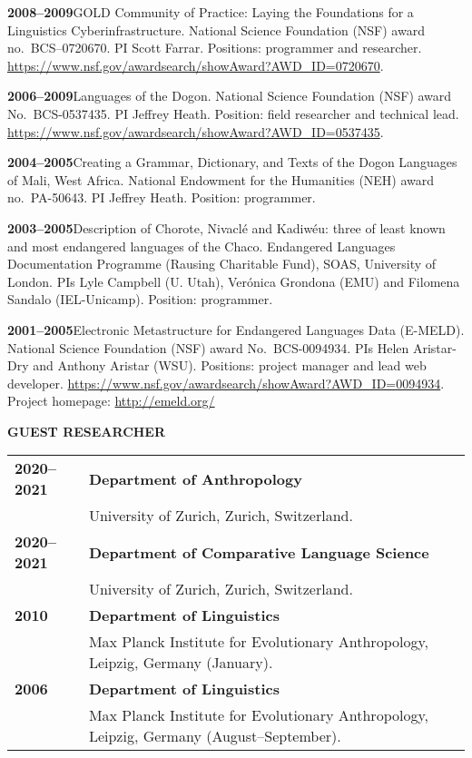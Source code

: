 \documentclass[11pt]{article}
\newcommand{\hangpara}{
 \setlength{\parindent}{0in} %
 \hangindent=0.42in %
}
\begin{document}
\vskip 6pt
\hangpara
{\bf 2008--2009}\hspace{1ex}GOLD Community of Practice: Laying the Foundations for a Linguistics Cyberinfrastructure. National Science Foundation (NSF) award no.\ BCS--0720670. PI Scott Farrar. Positions: programmer and researcher. \url{https://www.nsf.gov/awardsearch/showAward?AWD_ID=0720670}. %

\vskip 6pt
\hangpara
{\bf 2006--2009}\hspace{1ex}Languages of the Dogon. National Science Foundation (NSF) award No.\ BCS-0537435. PI Jeffrey Heath. Position: field researcher and technical lead. \url{https://www.nsf.gov/awardsearch/showAward?AWD_ID=0537435}.

\vskip 6pt
\hangpara
{\bf 2004--2005}\hspace{1ex}Creating a Grammar, Dictionary, and Texts of the Dogon Languages of Mali, West Africa. National Endowment for the Humanities (NEH) award no.\ PA-50643. PI Jeffrey Heath. Position: programmer.

\vskip 6pt
\hangpara
{\bf 2003--2005}\hspace{1ex}Description of Chorote, Nivacl{\'e} and Kadiw{\'e}u: three of least known and most endangered languages of the Chaco. Endangered Languages Documentation Programme (Rausing Charitable Fund), SOAS, University of London. PIs Lyle Campbell (U. Utah), Ver{\'o}nica Grondona (EMU) and Filomena Sandalo (IEL-Unicamp). Position: programmer.

\vskip 6pt
\hangpara
{\bf 2001--2005}\hspace{1ex}Electronic Metastructure for Endangered Languages Data (E-MELD). National Science Foundation (NSF) award No.\ BCS-0094934. PIs Helen Aristar-Dry and Anthony Aristar (WSU). Positions: project manager and lead web developer. \url{https://www.nsf.gov/awardsearch/showAward?AWD_ID=0094934}. Project homepage: \url{http://emeld.org/}


\vskip 20pt
\begin{flushleft}
{\bf GUEST RESEARCHER}
\end{flushleft}
\begin{tabular}{lp{5.5in}}
\bf 2020--2021	& {\bf Department of Anthropology} \\
& University of Zurich, Zurich, Switzerland. \\
\bf 2020--2021	& {\bf Department of Comparative Language Science} \\
& University of Zurich, Zurich, Switzerland. \\
\bf 2010	& {\bf Department of Linguistics}\\
& Max Planck Institute for Evolutionary Anthropology, Leipzig, Germany (January).  \\
\bf 2006	& {\bf Department of Linguistics}\\
& Max Planck Institute for Evolutionary Anthropology, Leipzig, Germany (August--September).  \\
\end{tabular}
\end{document}
